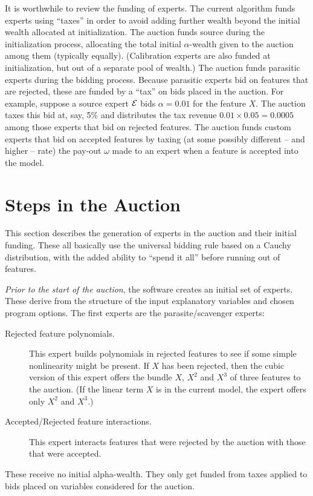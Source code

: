 \documentclass[12pt]{article}
\begin{document}
 It is worthwhile to review the funding of experts.  The current algorithm funds
 experts using ``taxes'' in order to avoid adding further wealth beyond the
 initial wealth allocated at initialization.  The auction funds source during
 the initialization process, allocating the total initial $\alpha$-wealth given
 to the auction among them (typically equally).  (Calibration experts are also
 funded at initialization, but out of a separate pool of wealth.)  The auction
 funds parasitic experts during the bidding process.  Because parasitic experts
 bid on features that are rejected, these are funded by a ``tax'' on bids placed
 in the auction.  For example, suppose a source expert $\cal E$ bids $\alpha =
 0.01$ for the feature $X$. The auction taxes this bid at, say, 5\% and
 distributes the tax revenue $0.01 \times 0.05 = 0.0005$ among those experts
 that bid on rejected features.  The auction funds custom experts that bid on
 accepted features by taxing (at some possibly different -- and higher -- rate)
 the pay-out $\omega$ made to an expert when a feature is accepted into the
 model.

\clearpage
\section{Steps in the Auction} %

 This section describes the generation of experts in the auction and their
 initial funding. These all basically use the universal bidding rule based on a
 Cauchy distribution, with the added ability to ``spend it all'' before running
 out of features.

 {\em Prior to the start of the auction}, the software creates an initial set of
 experts.  These derive from the structure of the input explanatory variables
 and chosen program options.  The first experts are the parasite/scavenger
 experts:
 \begin{description}
  \item[Rejected feature polynomials.] This expert builds polynomials in
 rejected features to see if some simple nonlinearity might be present.  If $X$
 has been rejected, then the cubic version of this expert offers the bundle $X$,
 $X^2$ and $X^3$ of three features to the auction.  (If the linear term $X$ is
 in the current model, the expert offers only $X^2$ and $X^3$.)
  \item[Accepted/Rejected feature interactions.] This expert interacts features
 that were rejected by the auction with those that were accepted.

 \end{description}
 These receive no initial alpha-wealth.  They only get funded from taxes applied
 to bids placed on variables considered for the auction.
\end{document}
